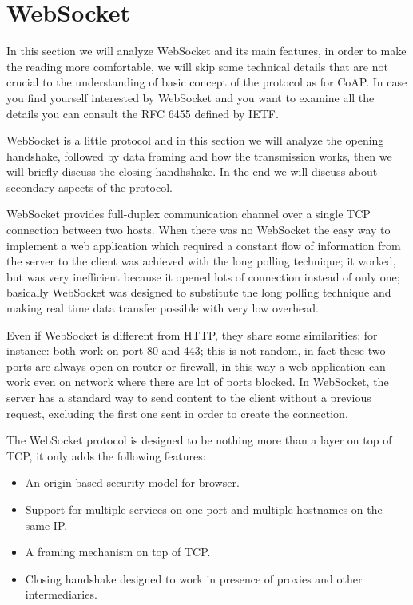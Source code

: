 \section{WebSocket}
In this section we will analyze WebSocket and its main features, in order to make the reading more comfortable,
we will skip some technical details that are not crucial to the understanding of basic concept of the protocol as for CoAP.\newline
In case you find yourself interested by WebSocket and you want to examine all the details you can consult the RFC 6455 defined by IETF\cite{rfcws}. \newline

WebSocket is a little protocol and in this section we will analyze the opening handshake, followed by data framing and how the transmission works, then we will briefly discuss the closing handhshake.\newline
In the end we will discuss about secondary aspects of the protocol.\newline

WebSocket provides full-duplex communication channel over a single TCP connection between two hosts.\newline
When there was no WebSocket the easy way to implement a web application which required a constant flow of information from
the server to the client was achieved with the long polling technique; it worked, but was very inefficient because it opened
lots of connection instead of only one; basically WebSocket was designed to substitute the long polling technique and making real time data transfer 
possible with very low overhead.\newline

Even if WebSocket is different from HTTP, they share some similarities; for instance: both work on port 80 and 443; this is not random, in fact these two ports
are always open on router or firewall, in this way a web application can work even on network where there are lot of ports blocked.\newline
In WebSocket, the server has a standard way to send content to the client without a previous request, excluding the first one sent in order to create the connection.\newline

The WebSocket protocol is designed to be nothing more than a layer on top of TCP, it only adds the following features:
\begin{itemize}
	\item An origin-based security model for browser.
	\item Support for multiple services on one port and multiple hostnames on the same IP.
	\item A framing mechanism on top of TCP.
	\item Closing handshake designed to work in presence of proxies and other intermediaries.
\end{itemize}


